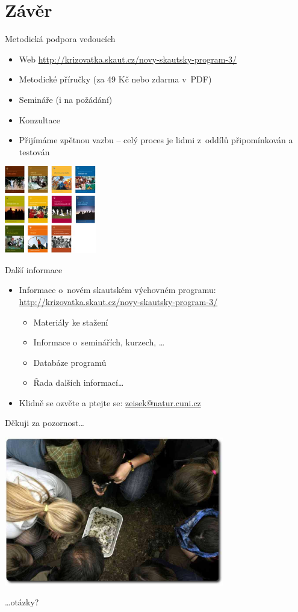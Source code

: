 \documentclass[compress,utf8,xcolor=dvipsnames]{beamer}
\begin{document}
\section{Závěr}

\begin{frame}{Metodická podpora vedoucích}
\begin{itemize}
\item Web \href{http://krizovatka.skaut.cz/novy-skautsky-program-3/}{http://krizovatka.skaut.cz/novy-skautsky-program-3/}
\item Metodické příručky (za 49 Kč nebo zdarma v~PDF)
\item Semináře (i na  požádání)
\item Konzultace
\item Přijímáme zpětnou vazbu -- celý proces je lidmi z~oddílů připomínkován a testován
\end{itemize}
\begin{center}
\includegraphics[width=4cm]{prirucky.png}
\end{center}
\end{frame}

\begin{frame}{Další informace}
\begin{itemize}
\item Informace o~novém skautském výchovném programu: \href{http://krizovatka.skaut.cz/novy-skautsky-program-3/}{http://krizovatka.skaut.cz/novy-skautsky-program-3/}
 \begin{itemize}
 \item Materiály ke stažení
 \item Informace o~seminářích, kurzech, \ldots
 \item Databáze programů
 \item Řada dalších informací\ldots
 \end{itemize}
\item Klidně se ozvěte a ptejte se: \href{mailto:zeisek@natur.cuni.cz}{zeisek@natur.cuni.cz}
\end{itemize}
\end{frame}

\begin{frame}{Děkuji za pozornost\ldots}
\begin{center}
\includegraphics[height=6.5cm]{zaver.jpg}
\end{center}
\begin{flushright}
\ldots otázky?
\end{flushright}
\end{frame}
\end{document}
